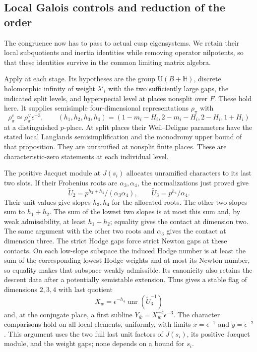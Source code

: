 \subsection{Local Galois controls and reduction of the order}

The congruence now has to pass to actual cusp eigensystems.
We retain their local subquotients and inertia identities while
removing operator nilpotents, so that these identities survive
in the common limiting matrix algebra.

Apply \cite[Proposition~8.5]{C} at each stage.  Its hypotheses
are the group $\mathrm U(B+\mathbb H)$, discrete holomorphic
infinity of weight $\lambda'_i$ with the two sufficiently large
gaps, the indicated split levels, and hyperspecial level at
places nonsplit over $F$.  These hold here.  It supplies
semisimple four-dimensional representations $\rho_\pi$ with
\[
 \rho_\pi^c\simeq\rho_\pi^\vee\epsilon^{-3},\qquad
 (h_1,h_2,h_3,h_4)
   =(1-m_i-H_i,2-m_i-H_i,2-H_i,1+H_i)
\]
at a distinguished $p$-place.  At split places their
Weil--Deligne parameters have the stated local Langlands
semisimplification and the monodromy upper bound of that
proposition.  They are unramified at nonsplit finite places.
These are characteristic-zero statements at each individual
level.

The positive Jacquet module at $J(s_i)$ allocates unramified
characters to its last two slots.  If their Frobenius roots are
$\alpha_3,\alpha_4$, the normalizations just proved give
\[
 \widetilde U_2=p^{h_3+h_4}/(\alpha_3\alpha_4),\qquad
 \widetilde U_3=p^{h_4}/\alpha_4.
\]
Their unit values give slopes $h_3,h_4$ for the allocated
roots.  The other two slopes sum to $h_1+h_2$.  The sum of the
lowest two slopes is at most this sum and, by weak admissibility,
at least $h_1+h_2$; equality gives the contact at dimension two.
The same argument with the other two roots and $\alpha_3$
gives the contact at dimension three.  The strict Hodge gaps
force strict Newton gaps at these contacts.  On each low-slope
subspace the induced Hodge number is at least the sum of the
corresponding lowest Hodge weights and at most its Newton
number, so equality makes that subspace weakly admissible.
Its canonicity also retains the descent data after a
potentially semistable extension.  Thus
\cite[Lemma~8.6]{C} gives
a stable flag of dimensions $2,3,4$ with last quotient
\[
 X_w=\epsilon^{-h_4}\operatorname{unr}(\widetilde U_3^{-1})
\]
and, at the conjugate place, a first subline
$Y_{\bar w}=X_w^{-c}\epsilon^{-3}$.  The character comparisons
hold on all local elements, uniformly, with limits
$x=\epsilon^{-1}$ and $y=\epsilon^{-2}$.  This argument uses
the two full last unit factors of $J(s_i)$, its positive Jacquet
module, and the weight gaps; none depends on a bound for $s_i$.

